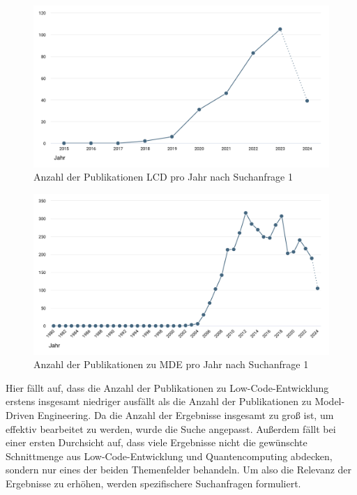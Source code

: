 \begin{figure}[h!]
    \centering
    \includegraphics[width=1\textwidth]{graphics/lcd_publications_over_years.png}
    \caption{Anzahl der Publikationen LCD pro Jahr nach Suchanfrage 1}
    \label{fig:publications_lcd_per_year}
\end{figure}

\begin{figure}[h!]
    \centering
    \includegraphics[width=1\textwidth]{graphics/mde_publications_over_years.png}
    \caption{Anzahl der Publikationen zu MDE pro Jahr nach Suchanfrage 1}
    \label{fig:publications_mde_per_year}
\end{figure}

Hier fällt auf, dass die Anzahl der Publikationen zu Low-Code-Entwicklung erstens insgesamt niedriger ausfällt 
als die Anzahl der Publikationen zu Model-Driven Engineering. Da die Anzahl der Ergebnisse insgesamt zu groß ist, um effektiv 
bearbeitet zu werden, wurde die Suche angepasst. Außerdem fällt bei einer ersten Durchsicht auf, dass viele Ergebnisse nicht die 
gewünschte Schnittmenge aus Low-Code-Entwicklung und Quantencomputing abdecken, sondern 
nur eines der beiden Themenfelder behandeln. Um also die Relevanz der Ergebnisse zu erhöhen, 
werden spezifischere Suchanfragen formuliert. 

